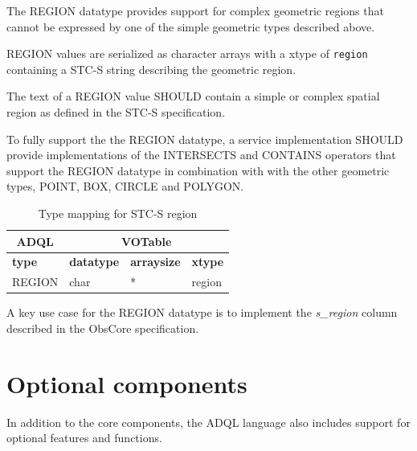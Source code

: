 \documentclass[11pt,a4paper]{ivoa}
\newcommand{\STCSspec}{STC-S specification\xspace}
\newcommand{\ObsCoreSpec}{ObsCore specification\xspace}
\begin{document}
The REGION datatype provides support for complex geometric regions that
cannot be expressed by one of the simple geometric types described above.

REGION values are serialized as character arrays with a xtype of
\verb:region: containing a STC-S string describing the geometric region.

The text of a REGION value SHOULD contain a simple or complex spatial
region as defined in the \STCSspec.

To fully support the the REGION datatype, a service implementation SHOULD
provide implementations of the INTERSECTS and CONTAINS operators that
support the REGION datatype in combination with with the other geometric
types, POINT, BOX, CIRCLE and POLYGON.

\begin{table}[thm]\footnotesize
    \begin{tabular}
        {|p{}|p{}|p{}|p{}|}
        \hline

        \hline
        \multicolumn{1}{|c|}{\textbf{ADQL}} &
        \multicolumn{3}{|c|}{\textbf{VOTable}}
        \tabularnewline
        
        \hline
        \textbf{type} &
        \textbf{datatype} &
        \textbf{arraysize} &
        \textbf{xtype}
        \tabularnewline

        \hline
        REGION &
        char &
        * &
        region
        \tabularnewline

        \hline
    \end{tabular}
    \caption{Type mapping for STC-S region}
    \label{table:types.geom.region}
\end{table}

A key use case for the REGION datatype is to implement the \textit{s\_region}
column described in the \ObsCoreSpec.

\clearpage
\section{Optional components}
\label{sec:optional}

In addition to the core components, the ADQL language also includes support
for optional features and functions.
\end{document}
